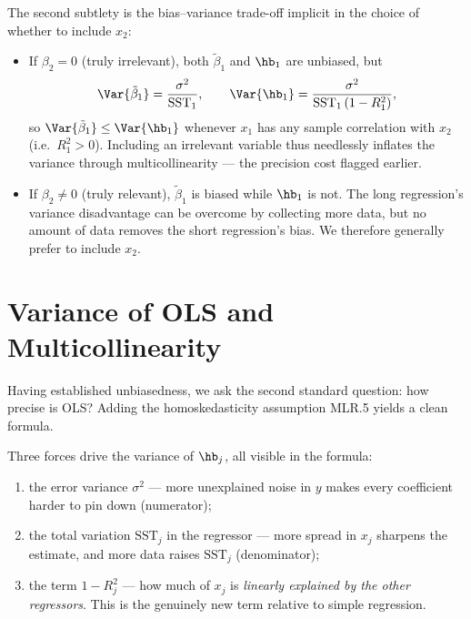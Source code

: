 The second subtlety is the bias--variance trade-off implicit in the choice of whether to include $x_2$:
\begin{itemize}
    \item If $\beta_2 = 0$ (truly irrelevant), both $\tilde\beta_1$ and $\hb_1$ are unbiased, but
    \[
    \Var{\tilde\beta_1} = \frac{\sigma^2}{\text{SST}_1}, \qquad
    \Var{\hb_1} = \frac{\sigma^2}{\text{SST}_1\,(1-R_1^2)},
    \]
    so $\Var{\tilde\beta_1} \le \Var{\hb_1}$ whenever $x_1$ has any sample correlation with $x_2$ (i.e.\ $R_1^2 > 0$). Including an irrelevant variable thus needlessly inflates the variance through multicollinearity --- the precision cost flagged earlier.
    \item If $\beta_2 \ne 0$ (truly relevant), $\tilde\beta_1$ is biased while $\hb_1$ is not. The long regression's variance disadvantage can be overcome by collecting more data, but no amount of data removes the short regression's bias. We therefore generally prefer to include $x_2$.
\end{itemize}

\section{Variance of OLS and Multicollinearity}

Having established unbiasedness, we ask the second standard question: how precise is OLS? Adding the homoskedasticity assumption MLR.5 yields a clean formula.


Three forces drive the variance of $\hb_j$, all visible in the formula:
\begin{enumerate}
    \item the error variance $\sigma^2$ --- more unexplained noise in $y$ makes every coefficient harder to pin down (numerator);
    \item the total variation $\text{SST}_j$ in the regressor --- more spread in $x_j$ sharpens the estimate, and more data raises $\text{SST}_j$ (denominator);
    \item the term $1 - R_j^2$ --- how much of $x_j$ is \emph{linearly explained by the other regressors}. This is the genuinely new term relative to simple regression.
\end{enumerate}

